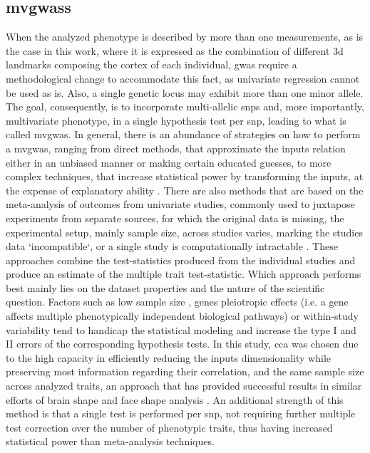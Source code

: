\subsection{\Acfp{mvgwas}}
When the analyzed phenotype is described by more than one measurements, as is the case in this work, where it is expressed as the combination of different \ac{3d} landmarks composing the cortex of each individual, \ac{gwas} require a methodological change to accommodate this fact, as univariate regression cannot be used as is. Also, a single genetic locus may exhibit more than one minor allele. The goal, consequently, is to incorporate multi-allelic \acsp{snp} and, more importantly, multivariate phenotype, in a single hypothesis test per \ac{snp}, leading to what is called \acf{mvgwas}. In general, there is an abundance of strategies on how to perform a \ac{mvgwas}, ranging from direct methods, that approximate the inputs relation either in an unbiased manner or making certain educated guesses, to more complex techniques, that increase statistical power by transforming the inputs, at the expense of explanatory ability \cite{Galesloot2014}. There are also methods that are based on the meta-analysis of outcomes from univariate studies, commonly used to juxtapose experiments from separate sources, for which the original data is missing, the experimental setup, mainly sample size, across studies varies, marking the studies data `incompatible`, or a single study is computationally intractable \cite{Uffelmann2021,Cichonska2016}. These approaches combine the test-statistics produced from the individual studies and produce an estimate of the multiple trait test-statistic. Which approach performs best mainly lies on the dataset properties and the nature of the scientific question. Factors such as low sample size \cite{Sheng2021}, genes pleiotropic effects \cite{Fernandes2021} (i.e. a gene affects multiple phenotypically independent biological pathways) or within-study variability \cite{Usui2021,Jackson2011} tend to handicap the statistical modeling and increase the type I and II errors of the corresponding hypothesis tests. In this study, \ac{cca} was chosen due to the high capacity in efficiently reducing the inputs dimensionality while preserving most information regarding their correlation, and the same sample size across analyzed traits, an approach that has provided successful results in similar efforts of brain shape and face shape analysis \cite{Claes2018,Naqvi2021}. An additional strength of this method is that a single test is performed per \ac{snp}, not requiring further multiple test correction over the number of phenotypic traits, thus having increased statistical power than meta-analysis techniques.



